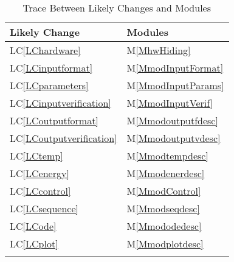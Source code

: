 \documentclass[12pt]{article}
\begin{document}
\begin{longtable}{l l}
\toprule
Likely Change & Modules
\\
\midrule
LC\ref{LChardware} & M\ref{MhwHiding}
\\
LC\ref{LCinputformat} & M\ref{MmodInputFormat}
\\
LC\ref{LCparameters} & M\ref{MmodInputParams}
\\
LC\ref{LCinputverification} & M\ref{MmodInputVerif}
\\
LC\ref{LCoutputformat} & M\ref{Mmodoutputfdesc}
\\
LC\ref{LCoutputverification} & M\ref{Mmodoutputvdesc}
\\
LC\ref{LCtemp} & M\ref{Mmodtempdesc}
\\
LC\ref{LCenergy} & M\ref{Mmodenerdesc}
\\
LC\ref{LCcontrol} & M\ref{MmodControl}
\\
LC\ref{LCsequence} & M\ref{Mmodseqdesc}
\\
LC\ref{LCode} & M\ref{Mmododedesc}
\\
LC\ref{LCplot} & M\ref{Mmodplotdesc}
\\
\bottomrule
\caption{Trace Between Likely Changes and Modules}
\label{Table:TracBetwLikeChanandModu}
\end{longtable}
\end{document}
